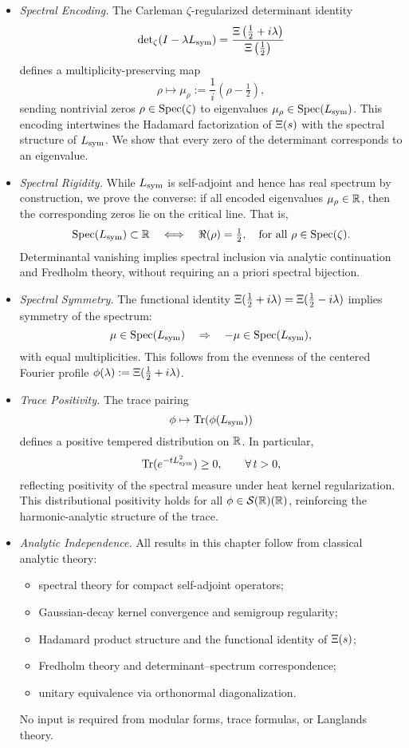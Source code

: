 \begin{itemize}
  \item \textit{Spectral Encoding.}  
  The Carleman \(\zeta\)-regularized determinant identity
  \[
  \det\nolimits_{\zeta}(I - \lambda L_{\mathrm{sym}})
  = \frac{\Xi\left(\tfrac{1}{2} + i\lambda\right)}{\Xi\left(\tfrac{1}{2}\right)}
  \]
  defines a multiplicity-preserving map
  \[
  \rho \mapsto \mu_\rho := \frac{1}{i}(\rho - \tfrac{1}{2}),
  \]
  sending nontrivial zeros \( \rho \in \operatorname{Spec}(\zeta) \) to eigenvalues \( \mu_\rho \in \operatorname{Spec}(L_{\mathrm{sym}}) \). This encoding intertwines the Hadamard factorization of \( \Xi(s) \) with the spectral structure of \( L_{\mathrm{sym}} \). We show that every zero of the determinant corresponds to an eigenvalue.

  \item \textit{Spectral Rigidity.}  
  While \( L_{\mathrm{sym}} \) is self-adjoint and hence has real spectrum by construction, we prove the converse: if all encoded eigenvalues \( \mu_\rho \in \mathbb{R} \), then the corresponding zeros lie on the critical line. That is,
  \[
  \operatorname{Spec}(L_{\mathrm{sym}}) \subset \mathbb{R}
  \quad \Longleftrightarrow \quad
  \Re(\rho) = \tfrac{1}{2}, \quad \text{for all } \rho \in \operatorname{Spec}(\zeta).
  \]
  Determinantal vanishing implies spectral inclusion via analytic continuation and Fredholm theory, without requiring an a priori spectral bijection.

  \item \textit{Spectral Symmetry.}  
  The functional identity \( \Xi(\tfrac{1}{2} + i\lambda) = \Xi(\tfrac{1}{2} - i\lambda) \) implies symmetry of the spectrum:
  \[
  \mu \in \operatorname{Spec}(L_{\mathrm{sym}}) \quad \Rightarrow \quad -\mu \in \operatorname{Spec}(L_{\mathrm{sym}}),
  \]
  with equal multiplicities. This follows from the evenness of the centered Fourier profile \( \phi(\lambda) := \Xi(\tfrac{1}{2} + i\lambda) \).

  \item \textit{Trace Positivity.}  
  The trace pairing
  \[
  \phi \mapsto \operatorname{Tr}(\phi(L_{\mathrm{sym}}))
  \]
  defines a positive tempered distribution on \( \mathbb{R} \). In particular,
  \[
  \operatorname{Tr}(e^{-tL_{\mathrm{sym}}^2}) \ge 0, \qquad \forall\, t > 0,
  \]
  reflecting positivity of the spectral measure under heat kernel regularization. This distributional positivity holds for all \( \phi \in \mathcal{S}(\mathbb{R})(\mathbb{R}) \), reinforcing the harmonic-analytic structure of the trace.

  \item \textit{Analytic Independence.}  
  All results in this chapter follow from classical analytic theory:
  \begin{itemize}
    \item spectral theory for compact self-adjoint operators;
    \item Gaussian-decay kernel convergence and semigroup regularity;
    \item Hadamard product structure and the functional identity of \( \Xi(s) \);
    \item Fredholm theory and determinant–spectrum correspondence;
    \item unitary equivalence via orthonormal diagonalization.
  \end{itemize}
  No input is required from modular forms, trace formulas, or Langlands theory.
\end{itemize}
